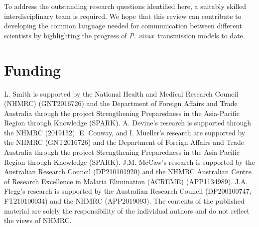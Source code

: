 \documentclass[12pt]{article}
\newcommand{\pv}{\textit{P. vivax}}
\begin{document}
To address the outstanding research questions identified here, a suitably skilled interdisciplinary team is required. We hope that this review can contribute to developing the common language needed for communication between different scientists by highlighting the progress of \pv~transmission models to date.



\section*{Funding}
L. Smith is supported by the National Health and Medical Research Council (NHMRC) (GNT2016726) and the Department of Foreign Affairs and Trade Australia through the project Strengthening Preparedness in the Asia-Pacific Region through Knowledge (SPARK). A. Devine’s research is supported through the NHMRC (2019152). E. Conway, and I. Mueller's research are supported by the NHMRC (GNT2016726) and the Department of Foreign Affairs and Trade Australia through the project Strengthening Preparedness in the Asia-Pacific Region through Knowledge (SPARK). J.M. McCaw’s research is supported by the Australian Research Council (DP210101920) and the NHMRC Australian Centre of Research Excellence in Malaria Elimination (ACREME) (APP1134989). J.A. Flegg’s research is supported by the Australian Research 
Council (DP200100747, FT210100034) and the NHMRC (APP2019093). The contents of the published material are solely the responsibility of the individual authors and do not reflect the views of NHMRC. 





\printbibliography[heading=bibintoc] %
\end{document}
